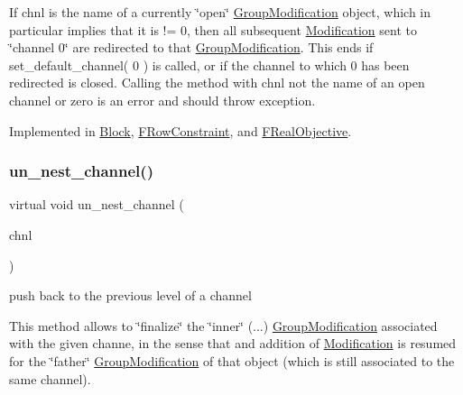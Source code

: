 If chnl is the name of a currently \char`\"{}open\char`\"{} \mbox{\hyperlink{class_s_m_spp__di__unipi__it_1_1_group_modification}{Group\+Modification}} object, which in particular implies that it is != 0, then all subsequent \mbox{\hyperlink{class_s_m_spp__di__unipi__it_1_1_modification}{Modification}} sent to \char`\"{}channel 0\char`\"{} are redirected to that \mbox{\hyperlink{class_s_m_spp__di__unipi__it_1_1_group_modification}{Group\+Modification}}. This ends if set\+\_\+default\+\_\+channel( 0 ) is called, or if the channel to which 0 has been redirected is closed. Calling the method with chnl not the name of an open channel or zero is an error and should throw exception. 

Implemented in \mbox{\hyperlink{class_s_m_spp__di__unipi__it_1_1_block_ae1e61f1d3f7185b6824f02488901a0ad}{Block}}, \mbox{\hyperlink{class_s_m_spp__di__unipi__it_1_1_f_row_constraint_ae1e61f1d3f7185b6824f02488901a0ad}{F\+Row\+Constraint}}, and \mbox{\hyperlink{class_s_m_spp__di__unipi__it_1_1_f_real_objective_ae1e61f1d3f7185b6824f02488901a0ad}{F\+Real\+Objective}}.

\mbox{\label{class_s_m_spp__di__unipi__it_1_1_observer_a668d3bd70f67db2213601cf671f115d9}} 
\subsubsection{\texorpdfstring{un\+\_\+nest\+\_\+channel()}{un\_nest\_channel()}}
{\footnotesize\ttfamily virtual void un\+\_\+nest\+\_\+channel (\begin{DoxyParamCaption}\item[{\mbox{\hyperlink{class_s_m_spp__di__unipi__it_1_1_observer_aa9ad8de42ffaf90023bfed5c085ad8bc}{c\+\_\+\+Chnl\+Name}}}]{chnl }\end{DoxyParamCaption})\hspace{0.3cm}{\ttfamily [pure virtual]}}



push back to the previous level of a channel 

This method allows to \char`\"{}finalize\char`\"{} the \char`\"{}inner\char`\"{} (...) \mbox{\hyperlink{class_s_m_spp__di__unipi__it_1_1_group_modification}{Group\+Modification}} associated with the given channe, in the sense that and addition of \mbox{\hyperlink{class_s_m_spp__di__unipi__it_1_1_modification}{Modification}} is resumed for the \char`\"{}father\char`\"{} \mbox{\hyperlink{class_s_m_spp__di__unipi__it_1_1_group_modification}{Group\+Modification}} of that object (which is still associated to the same channel).

